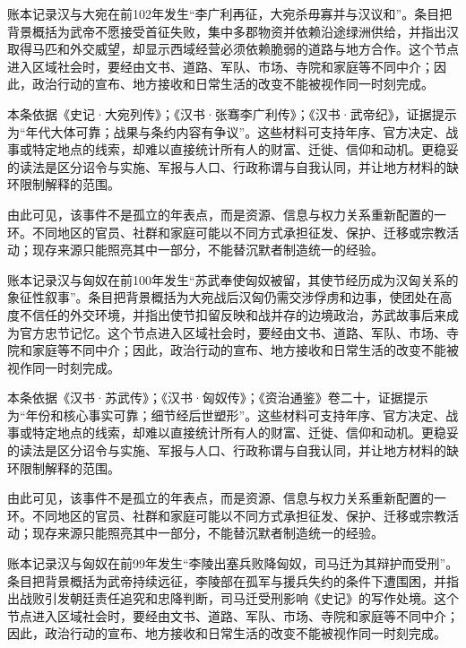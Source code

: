 账本记录汉与大宛在前102年发生“李广利再征，大宛杀毋寡并与汉议和”。条目把背景概括为武帝不愿接受首征失败，集中多郡物资并依赖沿途绿洲供给，并指出汉取得马匹和外交威望，却显示西域经营必须依赖脆弱的道路与地方合作。这个节点进入区域社会时，要经由文书、道路、军队、市场、寺院和家庭等不同中介；因此，政治行动的宣布、地方接收和日常生活的改变不能被视作同一时刻完成。

本条依据《史记·大宛列传》；《汉书·张骞李广利传》；《汉书·武帝纪》，证据提示为“年代大体可靠；战果与条约内容有争议”。这些材料可支持年序、官方决定、战事或特定地点的线索，却难以直接统计所有人的财富、迁徙、信仰和动机。更稳妥的读法是区分诏令与实施、军报与人口、行政称谓与自我认同，并让地方材料的缺环限制解释的范围。

由此可见，该事件不是孤立的年表点，而是资源、信息与权力关系重新配置的一环。不同地区的官员、社群和家庭可能以不同方式承担征发、保护、迁移或宗教活动；现存来源只能照亮其中一部分，不能替沉默者制造统一的经验。

账本记录汉与匈奴在前100年发生“苏武奉使匈奴被留，其使节经历成为汉匈关系的象征性叙事”。条目把背景概括为大宛战后汉匈仍需交涉俘虏和边事，使团处在高度不信任的外交环境，并指出使节扣留反映和战并存的边境政治，苏武故事后来成为官方忠节记忆。这个节点进入区域社会时，要经由文书、道路、军队、市场、寺院和家庭等不同中介；因此，政治行动的宣布、地方接收和日常生活的改变不能被视作同一时刻完成。

本条依据《汉书·苏武传》；《汉书·匈奴传》；《资治通鉴》卷二十，证据提示为“年份和核心事实可靠；细节经后世塑形”。这些材料可支持年序、官方决定、战事或特定地点的线索，却难以直接统计所有人的财富、迁徙、信仰和动机。更稳妥的读法是区分诏令与实施、军报与人口、行政称谓与自我认同，并让地方材料的缺环限制解释的范围。

由此可见，该事件不是孤立的年表点，而是资源、信息与权力关系重新配置的一环。不同地区的官员、社群和家庭可能以不同方式承担征发、保护、迁移或宗教活动；现存来源只能照亮其中一部分，不能替沉默者制造统一的经验。

账本记录汉与匈奴在前99年发生“李陵出塞兵败降匈奴，司马迁为其辩护而受刑”。条目把背景概括为武帝持续远征，李陵部在孤军与援兵失约的条件下遭围困，并指出战败引发朝廷责任追究和忠降判断，司马迁受刑影响《史记》的写作处境。这个节点进入区域社会时，要经由文书、道路、军队、市场、寺院和家庭等不同中介；因此，政治行动的宣布、地方接收和日常生活的改变不能被视作同一时刻完成。

